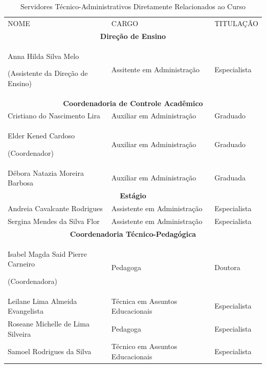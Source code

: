 \documentclass{paper}
\begin{document}

\begin{longtable}{|p{6cm}|p{5.5cm}|p{2.3cm}|}
\caption{Servidores Técnico-Administrativos Diretamente Relacionados ao Curso}\label{tab3} 
\vspace{-0.25cm}
\\ \hline 
\cellcolor{\cinza}NOME & \cellcolor{\cinza}CARGO & \cellcolor{\cinza}TITULAÇÃO \\ 
\hline


\multicolumn{3}{|c|}{\textbf{Direção de Ensino}} \\
\hline
Anna Hilda Silva Melo 

(Assistente da Direção de Ensino) & Assitente em Administração & Especialista \\ \hline

\multicolumn{3}{|c|}{\textbf{Coordenadoria de Controle Acadêmico}} \\
\hline
Cristiano do Nascimento Lira & Auxiliar em Administração &	Graduado \\ \hline
Elder Kened Cardoso 

(Coordenador) &	Auxiliar em Administração & Graduado \\ \hline 
Débora Natazia Moreira Barbosa & Auxiliar em Administração & Graduada \\ \hline

\multicolumn{3}{|c|}{\textbf{Estágio}} \\
\hline
Andreia Cavalcante Rodrigues & Assistente em Administração & Especialista  \\ \hline
Sergina Mendes da Silva Flor & Assistente em Administração & Especialista \\ \hline

\multicolumn{3}{|c|}{\textbf{Coordenadoria Técnico-Pedagógica}} \\
\hline
Isabel Magda Said Pierre Carneiro 

(Coordenadora) & Pedagoga & Doutora \\ \hline
Leilane Lima Almeida Evangelista & Técnica em Assuntos Educacionais & Especialista \\ \hline
Roseane Michelle de Lima Silveira & Pedagoga & Especialista \\ \hline
Samoel Rodrigues da Silva & Técnico em Assuntos Educacionais & Especialista \\ \hline


\end{longtable}
\end{document}
